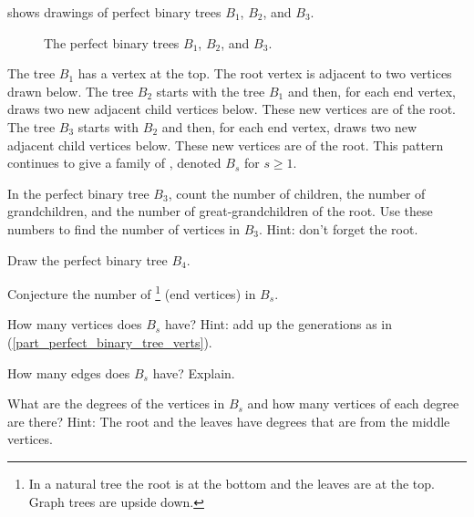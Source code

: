 \begin{exer}[\exerE] %
\label{exer_perfect_binary_trees}  
     shows drawings of perfect binary trees $B_1$, $B_2$, and $B_3$.
    
        \begin{figure} [hbtp]
            \centering
            
            \caption{The perfect binary trees $B_1$, $B_2$, and $B_3$.}
            \label{fig_perfect_binary_trees}
        \end{figure}
        
    The tree $B_1$ has a  vertex at the top. The root vertex is adjacent to two  vertices drawn below. The tree $B_2$ starts with the tree $B_1$ and then, for each end vertex, draws two new adjacent child vertices below. These new vertices are  of the root.  The tree $B_3$ starts with $B_2$ and then, for each end vertex, draws two new adjacent child vertices below. These new vertices are  of the root.  This pattern continues to give a family of , denoted $B_s$ for $s\ge 1$.
    \begin{exerpart}
        \item \label{part_perfect_binary_tree_verts} In the perfect binary tree $B_3$, count the number of children, the number of grandchildren, and the number of great-grandchildren of the root.  Use these numbers to find the number of vertices in $B_3$. Hint: don't forget the root.
        \item Draw the perfect binary tree $B_4$.
        \item Conjecture the number of \footnote{In a natural tree the root is at the bottom and the leaves are at the top.  Graph trees are upside down.} (end vertices) in $B_s$.
        \item How many vertices does $B_s$ have?  Hint: add up the generations as in (\ref{part_perfect_binary_tree_verts}).
        \item How many edges does $B_s$ have? Explain. 
        \item What are the degrees of the vertices in $B_s$ and how many vertices of each degree are there?  Hint: The root and the leaves have degrees that are from the middle vertices.
    \end{exerpart}
\end{exer}

